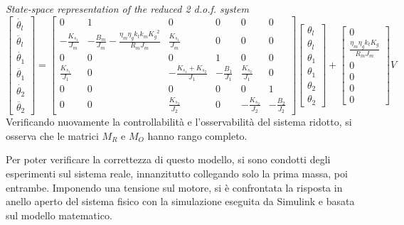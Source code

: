\textit{State-space representation of the reduced 2 d.o.f. system}
\begin{equation}
	\begin{bmatrix}
		\dot{\theta_l} \\
		\ddot{\theta_l} \\
		\dot{\theta_1} \\
		\ddot{\theta_1} \\
		\dot{\theta_2} \\
		\ddot{\theta_2}
	\end{bmatrix}
	=
	\begin{bmatrix}
		0 &1 & 0 & 0 & 0 & 0 \\
		-\frac{K_{s_1}}{J_m} & -\frac{B_m}{J_m}-\frac{\eta_m \eta_g k_t k_m {K_g}^2}{R_m J_m}  & \frac{K_{s_1}}{J_m} & 0 & 0 & 0 \\
		0 & 0 & 0 & 1 & 0 & 0 \\
		\frac{K_{s_1}}{J_1} & 0 & -\frac{K_{s_1}+K_{s_2}}{J_1} & -\frac{B_1}{J_1} & \frac{K_{s_2}}{J_1} & 0 \\
		0 & 0 & 0 & 0 & 0 & 1 \\
		0 & 0 & \frac{K_{s_2}}{J_2} & 0 & -\frac{K_{s_2}}{J_2} & -\frac{B_2}{J_2}
	\end{bmatrix}
	\begin{bmatrix}
		\theta_l \\
		\theta_l \\
		\theta_1 \\
		\theta_1 \\
		\theta_2 \\
		\theta_2
	\end{bmatrix}
	+
	\begin{bmatrix}
		0 \\
		\frac{\eta_m \eta_g k_t K_g}{R_m J_m} \\
		0 \\
		0 \\
		0 \\
		0
	\end{bmatrix}
	V
\end{equation}
Verificando nuovamente la controllabilità e l'osservabilità del sistema ridotto, si osserva che le matrici $M_R$ e $M_O$ hanno rango completo.

Per poter verificare la correttezza di questo modello, si sono condotti degli esperimenti sul sistema reale, innanzitutto collegando solo la prima massa, poi entrambe.
Imponendo una tensione sul motore, si è confrontata la risposta in anello aperto del sistema fisico con la simulazione eseguita da Simulink e basata sul modello matematico.
